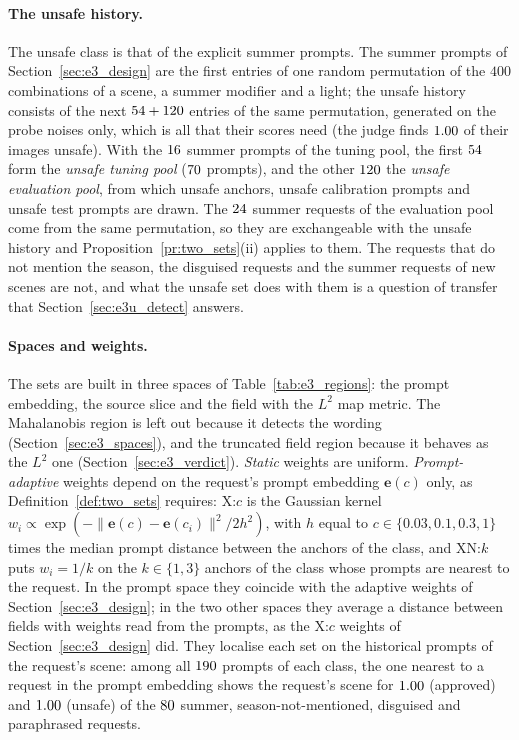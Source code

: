 \documentclass{article}
\newcommand{\be}{\mathbf{e}}
\theoremstyle{plain}
\theoremstyle{remark}
\begin{document}
\paragraph{The unsafe history.}
The unsafe class is that of the explicit summer prompts. The summer prompts of Section~\ref{sec:e3_design} are the first entries of
one random permutation of the $400$ combinations of a scene, a summer modifier and a light; the unsafe history consists of the next
$54+120$ entries of the same permutation, generated on the probe noises only, which is all that their scores need
(the judge finds $1.00$ of their images unsafe). With the $16$ summer prompts of the tuning pool, the first
$54$ form the \emph{unsafe tuning pool} ($70$ prompts), and the other $120$ the \emph{unsafe evaluation
pool}, from which unsafe anchors, unsafe calibration prompts and unsafe test prompts are drawn. The $24$ summer requests of
the evaluation pool come from the same permutation, so they are exchangeable with the unsafe history and
Proposition~\ref{pr:two_sets}(ii) applies to them. The requests that do not mention the season, the disguised requests and the summer
requests of new scenes are not, and what the unsafe set does with them is a question of transfer that Section~\ref{sec:e3u_detect}
answers.

\paragraph{Spaces and weights.}
The sets are built in three spaces of Table~\ref{tab:e3_regions}: the prompt embedding, the source slice and the field with the $L^2$
map metric. The Mahalanobis region is left out because it detects the wording (Section~\ref{sec:e3_spaces}), and the truncated field
region because it behaves as the $L^2$ one (Section~\ref{sec:e3_verdict}). \emph{Static} weights are uniform. \emph{Prompt-adaptive}
weights depend on the request's prompt embedding $\be(c)$ only, as Definition~\ref{def:two_sets} requires: X:$c$ is the Gaussian kernel
$w_i\propto\exp(-\|\be(c)-\be(c_i)\|^2/2h^2)$, with $h$ equal to $c\in\{0.03,0.1,0.3,1\}$ times the median prompt distance between the
anchors of the class, and XN:$k$ puts $w_i=1/k$ on the $k\in\{1,3\}$ anchors of the class whose prompts are nearest to the request.
In the prompt space they coincide with the adaptive weights of Section~\ref{sec:e3_design}; in the two other spaces they average a
distance between fields with weights read from the prompts, as the X:$c$ weights of Section~\ref{sec:e3_design} did. They localise
each set on the historical prompts of the request's scene: among all $190$ prompts of each class, the one nearest to a request in
the prompt embedding shows the request's scene for $1.00$ (approved) and $1.00$ (unsafe) of the $80$ summer,
season-not-mentioned, disguised and paraphrased requests.
\end{document}
